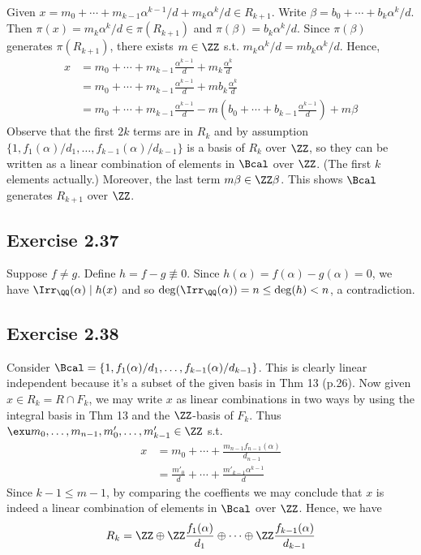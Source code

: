 \documentclass[../Chapter.tex]{subfiles}
\begin{document}
Given $x=m_0+\cdots+m_{k-1}\alpha^{k-1}/d+m_k\alpha^k/d \in R_{k+1}$. Write $\beta=b_0+\cdots+b_k\alpha^k/d$. Then $\pi(x)=m_k\alpha^k/d \in \pi(R_{k+1})$ and $\pi(\beta)=b_k\alpha^k/d$. Since $\pi(\beta)$ generates $\pi(R_{k+1})$, there exists $m\in\ZZ$ s.t. $m_k\alpha^k/d=mb_k\alpha^k/d$. Hence,
\begin{align*}
x &= m_0+\cdots+m_{k-1}\frac{\alpha^{k-1}}{d}+m_k\frac{\alpha^k}{d} \\
&= m_0+\cdots+m_{k-1}\frac{\alpha^{k-1}}{d}+mb_k\frac{\alpha^k}{d} \\
&= m_0+\cdots+m_{k-1}\frac{\alpha^{k-1}}{d}-m\left(b_0+\cdots+b_{k-1}\frac{\alpha^{k-1}}{d}\right)+m\beta
\end{align*}
Observe that the first $2k$ terms are in $R_{k}$ and by assumption $\{1,f_1(\alpha)/d_1,\ldots,f_{k-1}(\alpha)/d_{k-1}\}$ is a basis of $R_k$ over $\ZZ$, so they can be written as a linear combination of elements in $\Bcal$ over $\ZZ$. (The first $k$ elements actually.) Moreover, the last term $m\beta\in\ZZ\beta$. This shows $\Bcal$ generates $R_{k+1}$ over $\ZZ$.

\subsection*{Exercise 2.37}

Suppose $f\neq g$. Define $h=f-g\not\equiv0$. Since $h(\alpha)=f(\alpha)-g(\alpha)=0$, we have $\Irr_\QQ(\alpha)\mid h(x)$ and so $\deg(\Irr_\QQ(\alpha))=n\leq\deg(h)<n$, a contradiction.

\subsection*{Exercise 2.38}

Consider $\Bcal=\{1,f_1(\alpha)/d_1,\ldots,f_{k-1}(\alpha)/d_{k-1}\}$. This is clearly linear independent because it's a subset of the given basis in Thm 13 (p.26). Now given $x\in R_k=R\cap F_k$, we may write $x$ as linear combinations in two ways by using the integral basis in Thm 13 and the $\ZZ$-basis of $F_{k}$. Thus $\exu m_0,\ldots,m_{n-1},m'_0,\ldots,m'_{k-1}\in\ZZ$ s.t.
\begin{align*}
x &= m_0+\cdots+\frac{m_{n-1}f_{n-1}(\alpha)}{d_{n-1}} \\
&= \frac{m'_0}{d}+\cdots+\frac{m'_{k-1}\alpha^{k-1}}{d}
\end{align*}
Since $k-1\leq m-1$, by comparing the coeffients we may conclude that $x$ is indeed a linear combination of elements in $\Bcal$ over $\ZZ$. Hence, we have $$R_k=\ZZ\oplus\ZZ\frac{f_1(\alpha)}{d_1}\oplus\cdots\oplus\ZZ\frac{f_{k-1}(\alpha)}{d_{k-1}}$$
\end{document}
